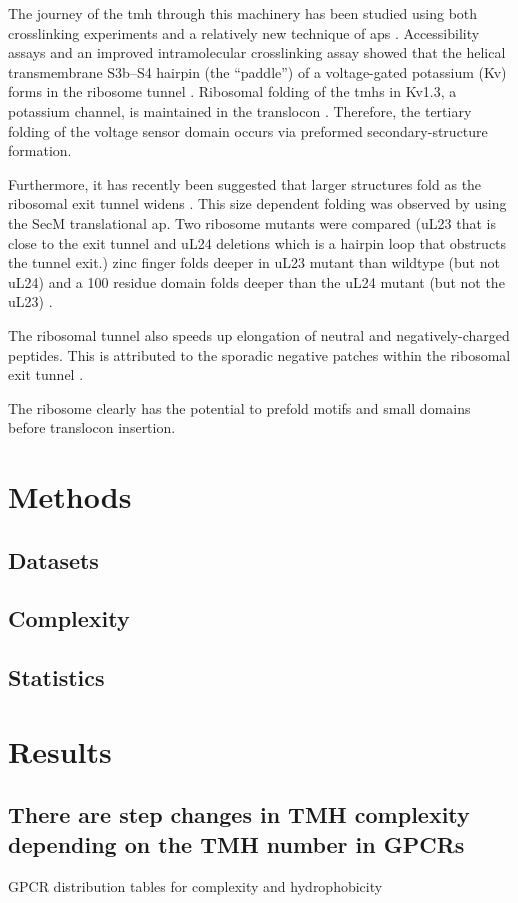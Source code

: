 The journey of the \gls{tmh} through this machinery has been studied using both crosslinking experiments and a relatively new technique of \gls{ap}s \cite{Cymer2014}.
Accessibility assays and an improved intramolecular crosslinking assay showed that the helical transmembrane S3b–S4 hairpin (the “paddle”) of a voltage-gated potassium (Kv) forms in the ribosome tunnel \cite{Tu2014}.
Ribosomal folding of the \gls{tmh}s in Kv1.3, a potassium channel, is maintained in the translocon \cite{Tu2010}.
Therefore, the tertiary folding of the voltage sensor domain occurs via preformed secondary-structure formation.

Furthermore, it has recently been suggested that larger structures fold as the ribosomal exit tunnel widens \cite{Kudva2018}.
This size dependent folding was observed by using the SecM translational \gls{ap}.
Two ribosome mutants were compared (uL23 that is close to the exit tunnel and uL24 deletions which is a hairpin loop that obstructs the tunnel exit.) zinc finger folds deeper in uL23 mutant than wildtype (but not uL24) and a 100 residue domain folds deeper than the uL24 mutant (but not the uL23) \cite{Kudva2018}.

The ribosomal tunnel also speeds up elongation of neutral and negatively-charged peptides.
This is attributed to the sporadic negative patches within the ribosomal exit tunnel \cite{Lu2008}.

The ribosome clearly has the potential to prefold motifs and small domains before translocon insertion.

\section{Methods}
\subsection{Datasets}
\subsection{Complexity}
\subsection{Statistics}

\section{Results}
\subsection{There are step changes in TMH complexity depending on the TMH number in GPCRs}
GPCR distribution tables for complexity and hydrophobicity

